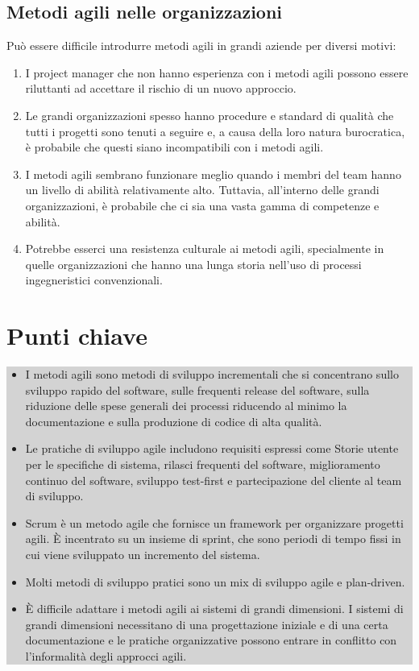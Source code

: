 \subsection{Metodi agili nelle organizzazioni}
Può essere difficile introdurre metodi agili in grandi aziende per diversi motivi:
\begin{enumerate}
    \item I project manager che non hanno esperienza con i metodi agili possono essere riluttanti ad accettare il rischio di un nuovo approccio.
    \item Le grandi organizzazioni spesso hanno procedure e standard di qualità che tutti i progetti sono tenuti a seguire e, a causa della loro natura burocratica, è probabile che questi siano incompatibili con i metodi agili.
    \item I metodi agili sembrano funzionare meglio quando i membri del team hanno un livello di abilità relativamente alto. Tuttavia, all'interno delle grandi organizzazioni, è probabile che ci sia una vasta gamma di competenze e abilità.
    \item Potrebbe esserci una resistenza culturale ai metodi agili, specialmente in quelle organizzazioni che hanno una lunga storia nell'uso di processi ingegneristici convenzionali.
\end{enumerate}

\section{Punti chiave}
\begin{center}
\begin{minipage}{\textwidth}
\colorbox{lightgray}{
\parbox{\linewidth}{
\begin{itemize} 
    \item I metodi agili sono metodi di sviluppo incrementali che si concentrano sullo sviluppo rapido del software, sulle frequenti release del software, sulla riduzione delle spese generali dei processi riducendo al minimo la documentazione e sulla produzione di codice di alta qualità.
    \item Le pratiche di sviluppo agile includono requisiti espressi come Storie utente per le specifiche di sistema, rilasci frequenti del software, miglioramento continuo del software, sviluppo test-first e partecipazione del cliente al team di sviluppo.
    \item Scrum è un metodo agile che fornisce un framework per organizzare progetti agili. È incentrato su un insieme di sprint, che sono periodi di tempo fissi in cui viene sviluppato un incremento del sistema.
    \item Molti metodi di sviluppo pratici sono un mix di sviluppo agile e plan-driven.
    \item È difficile adattare i metodi agili ai sistemi di grandi dimensioni. I sistemi di grandi dimensioni necessitano di una progettazione iniziale e di una certa documentazione e le pratiche organizzative possono entrare in conflitto con l'informalità degli approcci agili.
\end{itemize}
}}
\end{minipage}
\end{center}